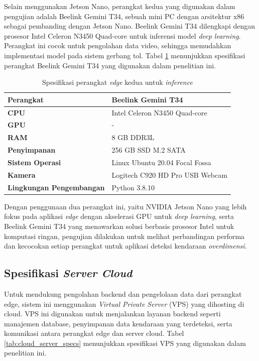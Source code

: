 Selain menggunakan Jetson Nano, perangkat kedua yang digunakan dalam pengujian adalah Beelink Gemini T34, sebuah mini PC dengan arsitektur x86 sebagai pembanding dengan Jetson Nano. Beelink Gemini T34 dilengkapi dengan prosesor Intel Celeron N3450 Quad-core untuk inferensi model \emph{deep learning}. Perangkat ini cocok untuk pengolahan data video, sehingga memudahkan implementasi model pada sistem gerbang tol. Tabel \ref{tab:beelink_t34_specs} menunjukkan spesifikasi perangkat Beelink Gemini T34 yang digunakan dalam penelitian ini.

\begin{table}[htbp]
  \centering
  \begin{tabular}{|l|l|}
  \hline
  \textbf{Perangkat} & Beelink Gemini T34 \\
  \hline
  \textbf{CPU} & Intel Celeron N3450 Quad-core \\
  \hline
  \textbf{GPU} & - \\
  \hline
  \textbf{RAM} & 8 GB DDR3L \\
  \hline
  \textbf{Penyimpanan} & 256 GB SSD M.2 SATA \\
  \hline
  \textbf{Sistem Operasi} & Linux Ubuntu 20.04 Focal Fossa \\
  \hline
  \textbf{Kamera} & Logitech C920 HD Pro USB Webcam \\
  \hline
  \textbf{Lingkungan Pengembangan} & Python 3.8.10 \\
  \hline
  \end{tabular}
  \caption{Spesifikasi perangkat \emph{edge} kedua untuk \emph{inference}}
  \label{tab:beelink_t34_specs}
\end{table}

Dengan penggunaan dua perangkat ini, yaitu NVIDIA Jetson Nano yang lebih fokus pada aplikasi \emph{edge} dengan akselerasi GPU untuk \emph{deep learning}, serta Beelink Gemini T34 yang menawarkan solusi berbasis prosesor Intel untuk komputasi ringan, pengujian dilakukan untuk melihat perbandingan performa dan kecocokan setiap perangkat untuk aplikasi deteksi kendaraan \emph{overdimensi}.

\subsection{Spesifikasi \emph{Server Cloud}}

Untuk mendukung pengolahan backend dan pengelolaan data dari perangkat edge, sistem ini menggunakan \emph{Virtual Private Server} (VPS) yang dihosting di cloud. VPS ini digunakan untuk menjalankan layanan backend seperti manajemen database, penyimpanan data kendaraan yang terdeteksi, serta komunikasi antara perangkat edge dan server cloud. Tabel \ref{tab:cloud_server_specs} menunjukkan spesifikasi VPS yang digunakan dalam penelitian ini.

